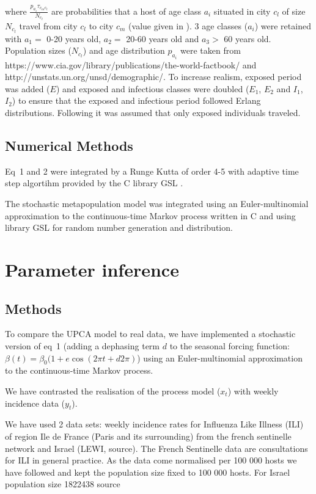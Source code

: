\documentclass[12pt]{article}
\begin{document}
where $\frac{p_{a_i} \tau_{c_mc_l}}{N_{c_l}}$ are probabilities that a
host of age class $a_i$ situated in city $c_l$ of size $N_{c_l}$
travel from city $c_l$ to city $c_m$ (value given in
\citep{Grais2003}).  3 age classes ($a_i$) were retained with $a_1 =$
0-20 years old, $a_2 =$ 20-60 years old and $a_3 >$ 60 years
old. Population sizes ($N_{c_l}$) and age distribution $p_{a_i}$ were
taken from
https://www.cia.gov/library/publications/the-world-factbook/ and
http://unstats.un.org/unsd/demographic/. To increase realism, exposed
period was added ($E$) and exposed and infectious classes were doubled
($E_1$, $E_2$ and $I_1$, $I_2$) to ensure that the exposed and
infectious period followed Erlang distributions.  Following
\citet{Cooper2006a} it was assumed that only exposed individuals
traveled.

\subsection{Numerical Methods}

Eq~1 and 2 were integrated by a Runge Kutta of order 4-5 with adaptive
time step algortihm provided by the C library GSL \citep{Galassi2003}.

The stochastic metapopulation model was integrated using an
Euler-multinomial approximation to the continuous-time Markov process
written in C and using library GSL \citep{Galassi2003} for random
number generation and distribution.

\clearpage

\section{Parameter inference}

\subsection{Methods}

To compare the UPCA model to real data, we have implemented a
stochastic version of eq~1 (adding a dephasing term $d$ to the
seasonal forcing function: $\beta(t)=\beta_0(1+e \cos(2 \pi t +d
2\pi)$) using an Euler-multinomial approximation to the
continuous-time Markov process.  

We have contrasted the realisation of the process model ($x_t$) with
weekly incidence data ($y_t$).

We have used 2 data sets: weekly incidence rates for Influenza Like
Illness (ILI) of region Ile de France (Paris and its surrounding) from
the french sentinelle network and Israel (LEWI, source). The French
Sentinelle data are consultations for ILI in general practice.  As the
data come normalised per 100 000 hosts we have followed
\citep{Finkenstaedt2005} and kept the population size fixed to 100 000
hosts.
For Israel population size 1822438 source 
\end{document}
